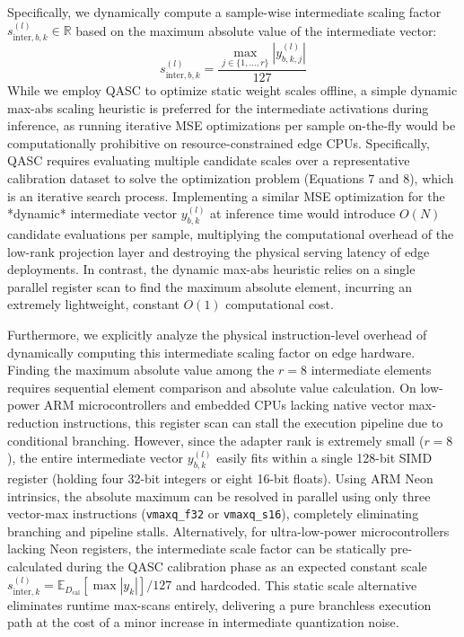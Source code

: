 Specifically, we dynamically compute a sample-wise intermediate scaling factor $s_{\text{inter}, b, k}^{(l)} \in \mathbb{R}$ based on the maximum absolute value of the intermediate vector:
\begin{equation}
  s_{\text{inter}, b, k}^{(l)} = \frac{\max_{j \in \{1, \dots, r\}} \left| y_{b, k, j}^{(l)} \right|}{127}
\end{equation}
While we employ QASC to optimize static weight scales offline, a simple dynamic max-abs scaling heuristic is preferred for the intermediate activations during inference, as running iterative MSE optimizations per sample on-the-fly would be computationally prohibitive on resource-constrained edge CPUs. Specifically, QASC requires evaluating multiple candidate scales over a representative calibration dataset to solve the optimization problem (Equations 7 and 8), which is an iterative search process. Implementing a similar MSE optimization for the *dynamic* intermediate vector $y_{b, k}^{(l)}$ at inference time would introduce $O(N)$ candidate evaluations per sample, multiplying the computational overhead of the low-rank projection layer and destroying the physical serving latency of edge deployments. In contrast, the dynamic max-abs heuristic relies on a single parallel register scan to find the maximum absolute element, incurring an extremely lightweight, constant $O(1)$ computational cost.

Furthermore, we explicitly analyze the physical instruction-level overhead of dynamically computing this intermediate scaling factor on edge hardware. Finding the maximum absolute value among the $r=8$ intermediate elements requires sequential element comparison and absolute value calculation. On low-power ARM microcontrollers and embedded CPUs lacking native vector max-reduction instructions, this register scan can stall the execution pipeline due to conditional branching. However, since the adapter rank is extremely small ($r = 8$), the entire intermediate vector $y_{b, k}^{(l)}$ easily fits within a single 128-bit SIMD register (holding four 32-bit integers or eight 16-bit floats). Using ARM Neon intrinsics, the absolute maximum can be resolved in parallel using only three vector-max instructions (\texttt{vmaxq\_f32} or \texttt{vmaxq\_s16}), completely eliminating branching and pipeline stalls. Alternatively, for ultra-low-power microcontrollers lacking Neon registers, the intermediate scale factor can be statically pre-calculated during the QASC calibration phase as an expected constant scale $s_{\text{inter}, k}^{(l)} = \mathbb{E}_{D_{\text{cal}}} [ \max | y_k | ] / 127$ and hardcoded. This static scale alternative eliminates runtime max-scans entirely, delivering a pure branchless execution path at the cost of a minor increase in intermediate quantization noise.

